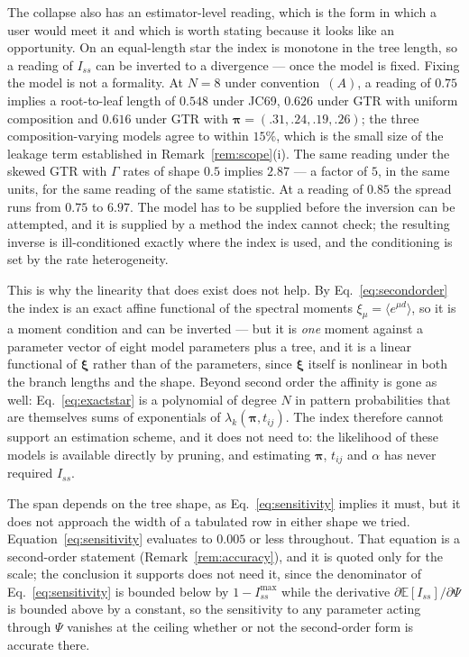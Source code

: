 \documentclass[preprint,12pt,authoryear]{elsarticle}
\newcommand{\Iss}{I_{ss}}
\newcommand{\bpi}{\boldsymbol{\pi}}
\newcommand{\bxi}{\boldsymbol{\xi}}
\newcommand{\E}{\mathbb{E}}
\theoremstyle{definition}
\theoremstyle{remark}
\begin{document}
\begin{sloppypar}
The collapse also has an estimator-level reading, which is the form in which
a user would meet it and which is worth stating because it looks like an
opportunity. On an equal-length star the index is monotone in the tree
length, so a reading of $\Iss$ can be inverted to a divergence --- once the
model is fixed. Fixing the model is not a formality. At $N=8$ under
convention~$(A)$, a reading of $0.75$ implies a root-to-leaf length of
$0.548$ under JC69, $0.626$ under GTR with uniform composition and $0.616$
under GTR with $\bpi=(.31,.24,.19,.26)$; the three composition-varying models
agree to within $15\%$, which is the small size of the leakage term
established in Remark~\ref{rem:scope}(i). The same reading under the skewed
GTR with $\Gamma$ rates of shape $0.5$ implies $2.87$ --- a factor of $5$, in
the same units, for the same reading of the same statistic. At a reading of
$0.85$ the spread runs from $0.75$ to $6.97$. The model has to be supplied
before the inversion can be attempted, and it is supplied by a method the
index cannot check; the resulting inverse is ill-conditioned exactly where
the index is used, and the conditioning is set by the rate heterogeneity.

This is why the linearity that does exist does not help. By
Eq.~\eqref{eq:secondorder} the index is an exact affine functional of the
spectral moments $\xi_\mu=\langle e^{\mu d}\rangle$, so it is a moment
condition and can be inverted --- but it is \emph{one} moment against a
parameter vector of eight model parameters plus a tree, and it is a linear
functional of $\bxi$ rather than of the parameters, since $\bxi$ itself is
nonlinear in both the branch lengths and the shape. Beyond second order the
affinity is gone as well: Eq.~\eqref{eq:exactstar} is a polynomial of degree
$N$ in pattern probabilities that are themselves sums of exponentials of
$\lambda_k(\bpi,t_{ij})$. The index therefore cannot support an estimation
scheme, and it does not need to: the likelihood of these models is available
directly by pruning, and estimating $\bpi$, $t_{ij}$ and $\alpha$ has never
required $\Iss$.

The span depends on the tree shape, as
Eq.~\eqref{eq:sensitivity} implies it must, but it does not approach the
width of a tabulated row in either shape we tried.
Equation~\eqref{eq:sensitivity} evaluates to $0.005$ or less throughout. That
equation is a second-order statement (Remark~\ref{rem:accuracy}), and it is
quoted only for the scale; the conclusion it supports does not need it, since
the denominator of Eq.~\eqref{eq:sensitivity} is bounded below by
$1-\Iss^{\max}$ while the derivative $\partial\E[\Iss]/\partial\Psi$ is
bounded above by a constant, so the sensitivity to any parameter acting
through $\Psi$ vanishes at the ceiling whether or not the second-order form is
accurate there.
\end{sloppypar}
\end{document}

